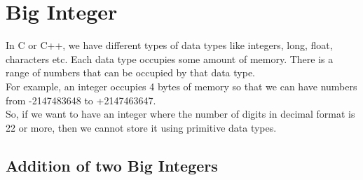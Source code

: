 \newpage
\chapter{\textbf{Big Integer}}
In C or C++, we have different types of data types like integers, long, float, characters etc. Each data type occupies some amount of memory. There is a range of numbers that can be occupied by that data type.\\
For example, an integer occupies 4 bytes of memory so that we can have numbers from -2147483648 to +2147463647.\\
So, if we want to have an integer where the number of digits in decimal format is 22 or more, then we cannot store it using primitive data types.\\

\newpage
\section{\textbf{Addition of two Big Integers}}


